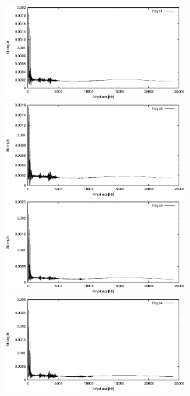 \documentclass[titlepage]{jarticle}
\begin{document}
\begin{figure}[H]
  \begin{minipage}{0.495\hsize}
    \centering
    \includegraphics[width=8cm]{img/hisyo1.eps}
    \caption{}
    \label{hisyo1}
  \end{minipage}
  \begin{minipage}{0.495\hsize}
    \centering
    \includegraphics[width=8cm]{img/hisyo2.eps}
    \caption{}
    \label{hisyo2}
  \end{minipage}


  \begin{minipage}{0.495\hsize}
    \centering
    \includegraphics[width=8cm]{img/hisyo3.eps}
    \caption{}
    \label{hisyo3}
  \end{minipage}
  \begin{minipage}{0.495\hsize}
    \centering
    \includegraphics[width=8cm]{img/hisyo4.eps}
    \caption{}
    \label{hisyo4}
  \end{minipage}
\end{figure}
\end{document}

